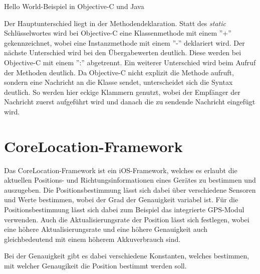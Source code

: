 \begin{listing}[htb!]
    \caption{Hello World-Beispiel in Objective-C und Java}
	\label{lst:helloworld_objc}
\end{listing}

Der Hauptunterschied liegt in der Methodendeklaration. Statt des \emph{static} Schlüsselwortes wird bei Objective-C eine Klassenmethode mit einem ''+'' gekennzeichnet, wobei eine Instanzmethode mit einem ''-'' deklariert wird. Der nächste Unterschied wird bei den Übergabewerten deutlich. Diese werden bei Objective-C mit einem '':'' abgetrennt.
Ein weiterer Unterschied wird beim Aufruf der Methoden deutlich. Da Objective-C nicht explizit die Methode aufruft, sondern eine Nachricht an die Klasse sendet, unterscheidet sich die Syntax deutlich. So werden hier eckige Klammern genutzt, wobei der Empfänger der Nachricht zuerst aufgeführt wird und danach die zu sendende Nachricht eingefügt wird.


\section{CoreLocation-Framework}
\label{sec:technologies:corelocation}
Das CoreLocation-Framework ist ein iOS-Framework, welches es erlaubt die aktuellen Positions- und Richtungsinformationen eines Gerätes zu bestimmen und auszugeben.
Die Positionsbestimmung lässt sich dabei über verschiedene Sensoren und Werte bestimmen, wobei der Grad der Genauigkeit variabel ist.
Für die Positionsbestimmung lässt sich dabei zum Beispiel das integrierte GPS-Modul verwenden.
Auch die Aktualisierungsrate der Position lässt sich festlegen, wobei eine höhere Aktualisierungsrate und eine höhere Genauigkeit auch gleichbedeutend mit einem höherem Akkuverbrauch sind.

Bei der Genauigkeit gibt es dabei verschiedene Konstanten, welches bestimmen, mit welcher Genaugikeit die Position bestimmt werden soll. 


